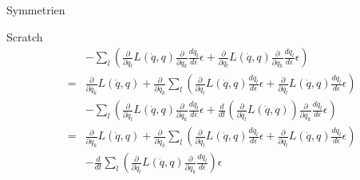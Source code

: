 \documentclass[a4paper,fleqn]{article}
\numberwithin{equation}{section}
\begin{document}
\begin{section}{Symmetrien}
\begin{subsection}{Scratch}
\begin{eqnarray*}
&&-\sum_l\left(\frac{\partial}{\partial \dot{q}_l}L\left(\dot{q},q\right)\frac{\partial}{\partial q_k}\frac{d\dot{q}_l}{d\epsilon}\epsilon
+\frac{\partial}{\partial q_l}L\left(\dot{q},q\right)\frac{\partial}{\partial q_k}\frac{dq_l}{d\epsilon}\epsilon\right)\\
&=&\frac{\partial}{\partial q_k}L\left(\dot{q},q\right)
+\frac{\partial}{\partial q_k}\sum_l\left(\frac{\partial}{\partial \dot{q}_l}L\left(\dot{q},q\right)\frac{d\dot{q}_l}{d\epsilon}\epsilon
+\frac{\partial}{\partial q_l}L\left(\dot{q},q\right)\frac{dq_l}{d\epsilon}\epsilon\right)\\
&&-\sum_l\left(\frac{\partial}{\partial \dot{q}_l}L\left(\dot{q},q\right)\frac{\partial}{\partial q_k}\frac{d\dot{q}_l}{d\epsilon}\epsilon
+\frac{d}{dt}\left(\frac{\partial}{\partial \dot{q}_l}L\left(\dot{q},q\right)\right)\frac{\partial}{\partial q_k}\frac{dq_l}{d\epsilon}\epsilon\right)\\
&=&\frac{\partial}{\partial q_k}L\left(\dot{q},q\right)
+\frac{\partial}{\partial q_k}\sum_l\left(\frac{\partial}{\partial \dot{q}_l}L\left(\dot{q},q\right)\frac{d\dot{q}_l}{d\epsilon}\epsilon
+\frac{\partial}{\partial q_l}L\left(\dot{q},q\right)\frac{dq_l}{d\epsilon}\epsilon\right)\\
&&-\frac{d}{dt}\sum_l\left(\frac{\partial}{\partial \dot{q}_l}L\left(\dot{q},q\right)\frac{\partial}{\partial q_k}\frac{dq_l}{d\epsilon}\right)\epsilon
\end{eqnarray*}
\end{subsection}
\end{section}
\end{document}
